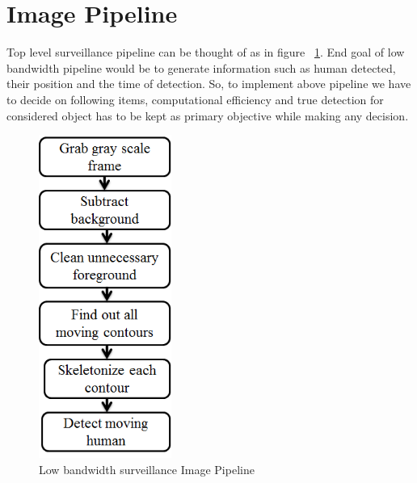 \pagebreak

\section{Image Pipeline}


\indent Top level surveillance pipeline can be thought of as in figure
~\ref{image_pipeline}.  End goal of low bandwidth pipeline would be to
generate information such as human detected, their position and the time
of detection. So, to implement above pipeline we have to decide on
following items, computational efficiency and true detection for
considered object has to be kept as primary objective while making any
decision.

\begin{figure}[!t]
\centering
\includegraphics[height=300pt]{Figures/image_pipeline}
\caption{Low bandwidth surveillance Image Pipeline}
\label{image_pipeline}
\end{figure}

